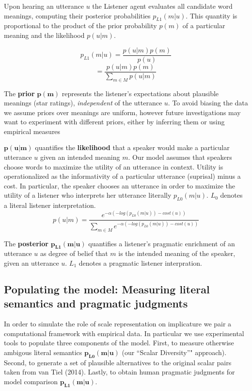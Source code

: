 \documentclass[10pt, letterpaper]{article}
\begin{document}
Upon hearing an utterance \(u\) the Listener agent evaluates all
candidate word meanings, computing their posterior probabilities
\(p_{L1}(m | u)\). This quantity is proportional to the product of the
prior probability \(p(m)\) of a particular meaning and the likelihood
\(p(u | m)\).

\[p_{L1}(m | u) = \frac{p(u | m)p(m)}{p(u)}\]
\[= \frac{p(u | m)p(m)}{\sum_{m \in M}p(u | m)}\]

The \textbf{prior} \(\mathbf{p(m)}\) represents the listener's
expectations about plausible meanings (star ratings), \emph{independent}
of the utterance \(u\). To avoid biasing the data we assume priors over
meanings are uniform, however future investigations may want to
experiment with different priors, either by inferring them or using
empirical measures

\(\mathbf{p(u | m)}\) quantifies the \textbf{likelihood} that a speaker
would make a particular utterance \(u\) given an intended meaning \(m\).
Our model assumes that speakers choose words to maximize the utility of
an utterance in context. Utility is operationalized as the informativity
of a particular utterance (suprisal) minus a cost. In particular, the
speaker chooses an utterance in order to maximize the utility of a
listener who interprets her utterance literally \(p_{L0}(m|u)\). \(L_0\)
denotes a literal listener interpretation.
\[p(u | m) = \frac{e^{-\alpha(-log(p_{L0}(m|u)) - cost(u))}}{\sum_{m \in M}e^{-\alpha(-log(p_{L0}(m|u)) - cost(u))}}\]

The \textbf{posterior} \(\mathbf{p_{L1}(m | u)}\) quantifies a
listener's pragmatic enrichment of an utterance \(u\) as degree of
belief that \(m\) is the intended meaning of the speaker, given an
utterance \(u\). \(L_1\) denotes a pragmatic listener interpration.

\subsection{Populating the model: Measuring literal semantics and
pragmatic
judgments}\label{populating-the-model-measuring-literal-semantics-and-pragmatic-judgments}

In order to simulate the role of scale representation on implicature we
pair a computational framework with empirical data. In particular we use
experimental tools to populate three components of the model. First, to
measure otherwise ambigous literal semantics \(\mathbf{p_{L0}(m|u)}\)
(our ``Scalar Diversity''" approach). Second, to generate a set of
plausible alternatives to the original scalar pairs taken from van Tiel
(2014). Lastly, to obtain human pragmatic judgments for model comparison
\(\mathbf{p_{L1}(m|u)}\).
\end{document}
